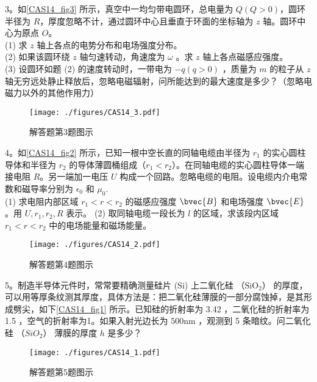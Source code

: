 3。如\autoref{CAS14_fig3} 所示，真空中一均匀带电圆环，总电量为 $Q(Q>0)$，圆环半径为 $R$，厚度忽略不计，通过圆环中心且垂直于环面的坐标轴为 $z$ 轴。圆环中心为原点 $O$。\\
(1) 求 $z$ 轴上各点的电势分布和电场强度分布。\\
(2) 如果该圆环绕 $z$ 轴匀速转动，角速度为 $\omega$ 。求 $z$ 轴上各点磁感应强度。\\
(3) 设圆环如题 (2) 的速度转动时，一带电为 $-q(q>0)$ ，质量为 $m$ 的粒子从 $z$ 轴无穷远处静止释放后，忽略电磁辐射，问所能达到的最大速度是多少？（忽略电磁力以外的其他作用力）
\begin{figure}[ht]
\centering
\texttt{[image: ./figures/CAS14\_3.pdf]}
\caption{解答题第3题图示} \label{CAS14_fig3}
\end{figure}

4。如\autoref{CAS14_fig2} 所示，已知一根中空长直的同轴电缆由半径为 $r_1$ 的实心圆柱导体和半径为 $r_2$ 的导体薄圆桶组成（$r_1<r_2$）。在同轴电缆的实心圆柱导体一端接电阻 $R$。另一端加一电压 $U$ 构成一个回路。忽略电缆的电阻。设电缆内介电常数和磁导率分别为 $\epsilon_0$ 和 $\mu_0$.\\
(1) 求电阻内部区域 $r_1<r<r_2$ 的磁感应强度 $\bvec{B}$ 和电场强度 $\bvec{E}$。用 $U,r_1,r_2,R$ 表示。
(2) 取同轴电缆一段长为 $l$ 的区域，求该段内区域 $r_1<r<r_2$ 中的电场能量和磁场能量。
\begin{figure}[ht]
\centering
\texttt{[image: ./figures/CAS14\_2.pdf]}
\caption{解答题第4题图示} \label{CAS14_fig2}
\end{figure}

5。制造半导体元件时，常常要精确测量硅片 (Si) 上二氧化硅 （$\mathrm{SiO_2}$） 的厚度，可以用等厚条纹测其厚度，具体方法是：把二氧化硅薄膜的一部分腐蚀掉，是其形成劈尖，如下\autoref{CAS14_fig1} 所示。已知硅的折射率为 3.42 ，二氧化硅的折射率为 1.5 ，空气的折射率为1。如果入射光边长为 $500\mathrm{nm}$ ，观测到 5 条暗纹。问二氧化硅 （$SiO_2$） 薄膜的厚度 $h$ 是多少？
\begin{figure}[ht]
\centering
\texttt{[image: ./figures/CAS14\_1.pdf]}
\caption{解答题第5题图示} \label{CAS14_fig1}
\end{figure}